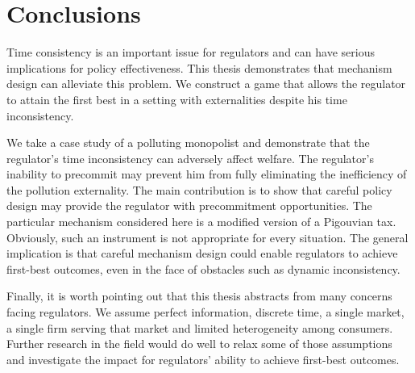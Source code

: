 


\chapter{Conclusions}

Time consistency is an important issue for regulators and can have serious
implications for policy effectiveness. This thesis demonstrates that
mechanism design can alleviate this problem. We construct a game that allows
the regulator to attain the first best in a setting with externalities
despite his time inconsistency.

We take a case study of a polluting monopolist and demonstrate that the
regulator's time inconsistency can adversely affect welfare. The regulator's
inability to precommit may prevent him from fully eliminating the
inefficiency of the pollution externality. The main contribution is to show
that careful policy design may provide the regulator with precommitment
opportunities. The particular mechanism considered here is a modified
version of a Pigouvian tax. Obviously, such an instrument is not appropriate
for every situation. The general implication is that
careful mechanism design could enable regulators to achieve first-best
outcomes, even in the face of obstacles such as dynamic inconsistency.

Finally, it is worth pointing out that this thesis abstracts from many
concerns facing regulators. We assume perfect information, discrete time, a
single market, a single firm serving that market and limited heterogeneity
among consumers. Further research in the field would do well to relax some
of those assumptions and investigate the impact for regulators' ability to
achieve first-best outcomes.

